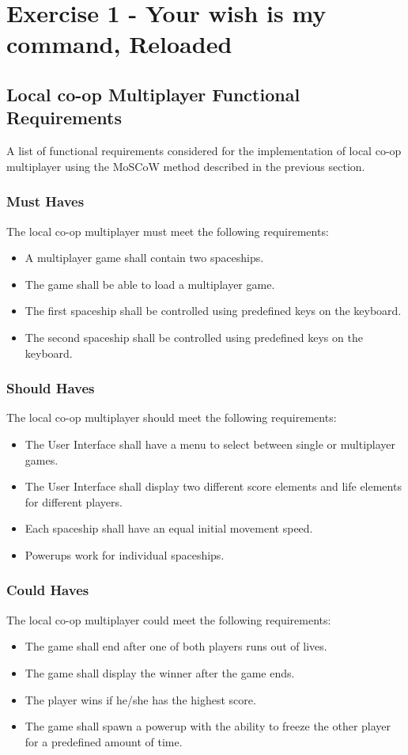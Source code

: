 \documentclass[10pt]{article}
\begin{document}
\section{Exercise 1 - Your wish is my command, Reloaded }
\subsection{Local co-op Multiplayer Functional Requirements}

A list of functional requirements considered for the implementation of local co-op multiplayer using the MoSCoW method described in the previous section.

\subsubsection{Must Haves}
The local co-op multiplayer must meet the following requirements:
\begin{itemize}
	\item A multiplayer game shall contain two spaceships.
	\item The game shall be able to load a multiplayer game.
	\item The first spaceship shall be controlled using predefined keys on the keyboard.
	\item The second spaceship shall be controlled using predefined keys on the keyboard.
\end{itemize}

\subsubsection{Should Haves}
The local co-op multiplayer should meet the following requirements:
\begin{itemize}
	\item The User Interface shall have a menu to select between single or multiplayer games.
	\item The User Interface shall display two different score elements and life elements for different players.
	\item Each spaceship shall have an equal initial movement speed.
	\item Powerups work for individual spaceships.
\end{itemize}

\subsubsection{Could Haves}
The local co-op multiplayer could meet the following requirements:
\begin{itemize}
	\item The game shall end after one of both players runs out of lives.
	\item The game shall display the winner after the game ends.
	\item The player wins if he/she has the highest score.
	\item The game shall spawn a powerup with the ability to freeze the other player for a predefined amount of time.
\end{itemize}
\end{document}
